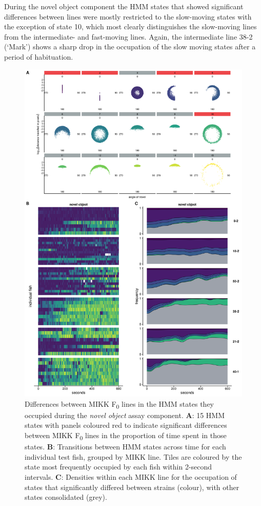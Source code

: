 \documentclass[
]{book}
\begin{document}
During the novel object component the HMM states that showed significant differences between lines were mostly restricted to the slow-moving states with the exception of state 10, which most clearly distinguishes the slow-moving lines from the intermediate- and fast-moving lines. Again, the intermediate line \textcolor{38-2 (‘Mark’)_00C08B}{38-2 (‘Mark’)} shows a sharp drop in the occupation of the slow moving states after a period of habituation.



\begin{figure}
\includegraphics[width=1\linewidth]{figs/mikk_behaviour/select_0.08_15_dge_no} \caption{Differences between MIKK F\textsubscript{0} lines in the HMM states they occupied during the \emph{novel object} assay component. \textbf{A}: 15 HMM states with panels coloured red to indicate significant differences between MIKK F\textsubscript{0} lines in the proportion of time spent in those states. \textbf{B}: Transitions between HMM states across time for each individual test fish, grouped by MIKK line. Tiles are coloured by the state most frequently occupied by each fish within 2-second intervals. \textbf{C}: Densities within each MIKK line for the occupation of states that significantly differed between strains (colour), with other states consolidated (grey).}\label{fig:F2-time-dge-no}
\end{figure}
\end{document}
